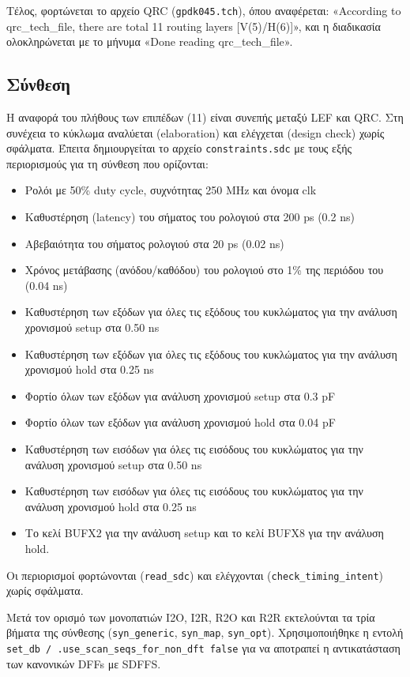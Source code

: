 Τέλος, φορτώνεται το αρχείο QRC (\texttt{gpdk045.tch}), όπου αναφέρεται: «According to qrc\_tech\_file, there are total 11 routing layers [V(5)/H(6)]», και η διαδικασία ολοκληρώνεται με το μήνυμα «Done reading qrc\_tech\_file».

\subsection{Σύνθεση}
Η αναφορά του πλήθους των επιπέδων (11) είναι συνεπής μεταξύ LEF και QRC.
Στη συνέχεια το κύκλωμα αναλύεται (elaboration) και ελέγχεται (design check) χωρίς σφάλματα.
Έπειτα δημιουργείται το αρχείο \texttt{constraints.sdc} με τους εξής περιορισμούς για τη σύνθεση που ορίζονται:

\begin{itemize}
    \item Ρολόι με 50\% duty cycle, συχνότητας 250 MHz και όνομα clk
    \item Καθυστέρηση (latency) του σήματος του ρολογιού στα 200 ps (0.2 ns)
    \item Αβεβαιότητα του σήματος ρολογιού στα 20 ps (0.02 ns)
    \item Χρόνος μετάβασης (ανόδου/καθόδου) του ρολογιού στο 1\% της περιόδου του (0.04 ns)
    \item Καθυστέρηση των εξόδων για όλες τις εξόδους του κυκλώματος για την ανάλυση χρονισμού setup στα 0.50 ns
    \item Καθυστέρηση των εξόδων για όλες τις εξόδους του κυκλώματος για την ανάλυση χρονισμού hold στα 0.25 ns
    \item Φορτίο όλων των εξόδων για ανάλυση χρονισμού setup στα 0.3 pF
    \item Φορτίο όλων των εξόδων για ανάλυση χρονισμού hold στα 0.04 pF
    \item Καθυστέρηση των εισόδων για όλες τις εισόδους του κυκλώματος για την ανάλυση χρονισμού setup στα 0.50 ns
    \item Καθυστέρηση των εισόδων για όλες τις εισόδους του κυκλώματος για την ανάλυση χρονισμού hold στα 0.25 ns
    \item Το κελί BUFX2 για την ανάλυση setup και το κελί BUFX8 για την ανάλυση hold.
\end{itemize}

Οι περιορισμοί φορτώνονται (\texttt{read\_sdc}) και ελέγχονται (\texttt{check\_timing\_intent}) χωρίς σφάλματα.

Μετά τον ορισμό των μονοπατιών I2O, I2R, R2O και R2R εκτελούνται τα τρία βήματα της σύνθεσης (\texttt{syn\_generic}, \texttt{syn\_map}, \texttt{syn\_opt}).
Χρησιμοποιήθηκε η εντολή \texttt{set\_db / .use\_scan\_seqs\_for\_non\_dft false} για να αποτραπεί η αντικατάσταση των κανονικών DFFs με SDFFS.

